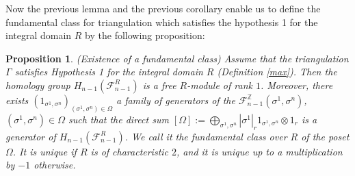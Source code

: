 \documentclass{article}
\newtheorem{proposition}{Proposition}
\begin{document}
Now the previous lemma and the previous corollary enable us to define the fundamental class for triangulation which satisfies the hypothesis 1 for the integral domain $R$ by the following proposition:

\begin{proposition}
    (Existence of a fundamental class) Assume that the triangulation $\Gamma$ satisfies Hypothesis 1 for the integral domain $R$ (Definition \ref{max}). Then the homology group $H_{n-1}(\mathcal{F}_{n-1}^{R})$ is a free $R$-module of rank $1$. Moreover, there exists $(1_{\sigma^1,\sigma^n})_{(\sigma^1,\sigma^n) \in \Omega}$ a family of generators of the $\mathcal{F}_{n-1}^{\mathbb{Z}}(\sigma^1,\sigma^n)$, $(\sigma^1,\sigma^n) \in \Omega$ such that the direct sum $[\Omega]:= \bigoplus_{\sigma^1,\sigma^n} |\sigma^1|_r1_{\sigma^1,\sigma^n} \otimes 1_r$ is a generator of $H_{n-1}(\mathcal{F}_{n-1}^{R})$. We call it the fundamental class over $R$ of the poset $\Omega$. It is unique if $R$ is of characteristic $2$, and it is unique up to a multiplication by $-1$ otherwise.
\end{proposition}
\end{document}

